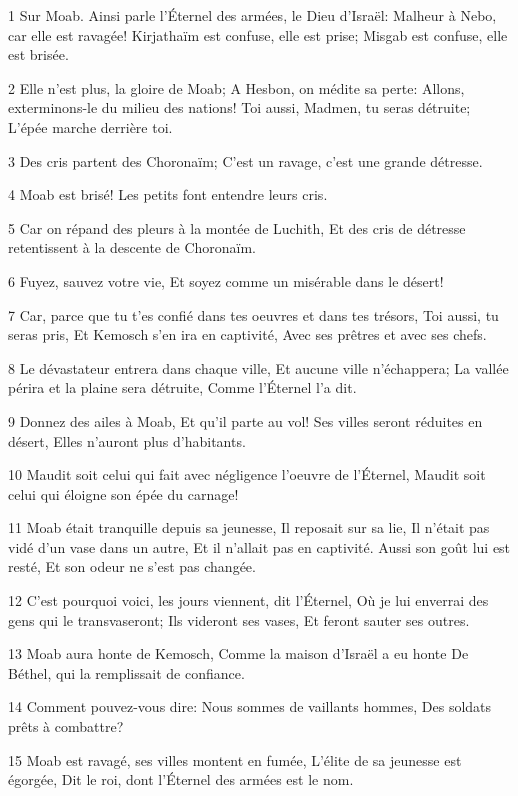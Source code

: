\par 1 Sur Moab. Ainsi parle l'Éternel des armées, le Dieu d'Israël: Malheur à Nebo, car elle est ravagée! Kirjathaïm est confuse, elle est prise; Misgab est confuse, elle est brisée.
\par 2 Elle n'est plus, la gloire de Moab; A Hesbon, on médite sa perte: Allons, exterminons-le du milieu des nations! Toi aussi, Madmen, tu seras détruite; L'épée marche derrière toi.
\par 3 Des cris partent des Choronaïm; C'est un ravage, c'est une grande détresse.
\par 4 Moab est brisé! Les petits font entendre leurs cris.
\par 5 Car on répand des pleurs à la montée de Luchith, Et des cris de détresse retentissent à la descente de Choronaïm.
\par 6 Fuyez, sauvez votre vie, Et soyez comme un misérable dans le désert!
\par 7 Car, parce que tu t'es confié dans tes oeuvres et dans tes trésors, Toi aussi, tu seras pris, Et Kemosch s'en ira en captivité, Avec ses prêtres et avec ses chefs.
\par 8 Le dévastateur entrera dans chaque ville, Et aucune ville n'échappera; La vallée périra et la plaine sera détruite, Comme l'Éternel l'a dit.
\par 9 Donnez des ailes à Moab, Et qu'il parte au vol! Ses villes seront réduites en désert, Elles n'auront plus d'habitants.
\par 10 Maudit soit celui qui fait avec négligence l'oeuvre de l'Éternel, Maudit soit celui qui éloigne son épée du carnage!
\par 11 Moab était tranquille depuis sa jeunesse, Il reposait sur sa lie, Il n'était pas vidé d'un vase dans un autre, Et il n'allait pas en captivité. Aussi son goût lui est resté, Et son odeur ne s'est pas changée.
\par 12 C'est pourquoi voici, les jours viennent, dit l'Éternel, Où je lui enverrai des gens qui le transvaseront; Ils videront ses vases, Et feront sauter ses outres.
\par 13 Moab aura honte de Kemosch, Comme la maison d'Israël a eu honte De Béthel, qui la remplissait de confiance.
\par 14 Comment pouvez-vous dire: Nous sommes de vaillants hommes, Des soldats prêts à combattre?
\par 15 Moab est ravagé, ses villes montent en fumée, L'élite de sa jeunesse est égorgée, Dit le roi, dont l'Éternel des armées est le nom.

